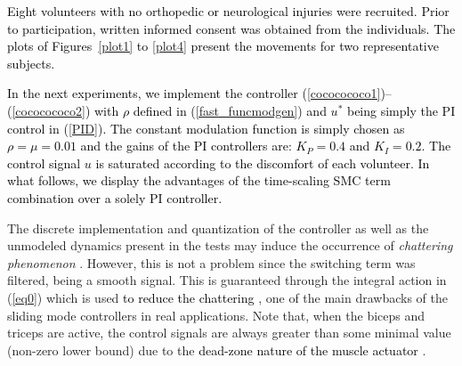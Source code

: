 \documentclass[review]{elsarticle}
\begin{document}
\textcolor{black}{Eight volunteers with no orthopedic or neurological injuries were recruited. Prior to participation, written informed consent was obtained from the \textcolor{black}{individuals.} The plots of Figures~\ref{plot1} to \ref{plot4} present the movements for two representative subjects.} 

\textcolor{black}{In the next experiments, we implement the controller (\ref{cococococo1})--(\ref{cococococo2}) with $\rho$ defined in (\ref{fast_funcmodgen}) and $u^*$ being simply the PI control in (\ref{PID}). The constant modulation function is simply chosen as $\rho=\mu=0.01$ and the gains of the PI controllers are: $K_P=0.4$ and $K_I=0.2$. The control signal $u$ is saturated according to the discomfort of each volunteer. In what follows, we display the advantages of the time-scaling SMC term combination over a solely PI controller.}

The discrete implementation and quantization of the controller as well as the unmodeled dynamics present in the tests may induce the occurrence of \textit{chattering phenomenon} \cite{UGS:99}. However, this is not a problem since the switching term was filtered, being a smooth signal. This is guaranteed through the integral action in (\ref{eq0}) which is used \textcolor{black}{to reduce the chattering
\cite{FE:2014,AE:2009}}, one of the main drawbacks of the sliding mode controllers in real applications. Note that, when the biceps and triceps are active, the control signals are always greater than some minimal value (non-zero lower bound) due to the 
\textcolor{black}{dead-zone nature of the muscle actuator \cite{SNPHFFR:2005}}.

\newpage
\end{document}
